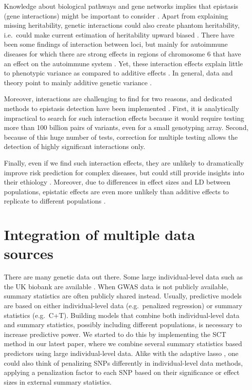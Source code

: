 Knowledge about biological pathways and gene networks implies that epistasis (gene interactions) might be important to consider \cite[]{hill2008data}. 
Apart from explaining missing heritability, genetic interactions could also create phantom heritability, i.e.\ could make current estimation of heritability upward biased \cite[]{zuk2012mystery}.
There have been some findings of interaction between loci, but mainly for autoimmune diseases for which there are strong effects in regions of chromosome 6 that have an effect on the autoimmune system \cite[]{lenz2015widespread,goudey2017interactions}.
Yet, these interaction effects explain little to phenotypic variance as compared to additive effects \cite[]{lenz2015widespread}.
In general, data and theory point to mainly additive genetic variance \cite[]{hill2008data}.

Moreover, interactions are challenging to find for two reasons, and dedicated methods to epistasis detection have been implemented \cite[]{niel2015survey}. First, it is analytically impractical to search for such interaction effects because it would require testing more than 100 billion pairs of variants, even for a small genotyping array. Second, because of this huge number of tests, correction for multiple testing allows the detection of highly significant interactions only.

Finally, even if we find such interaction effects, they are unlikely to dramatically improve risk prediction for complex diseases, but could still provide insights into their ethiology \cite[]{aschard2012inclusion}. 
Moreover, due to differences in effect sizes and LD between populations, epistatic effects are even more unlikely than additive effects to replicate to different populations  \cite[]{hill2008data,visscher201710}.

\section{Integration of multiple data sources}

There are many genetic data out there. Some large individual-level data such as the UK biobank are available \cite[]{bycroft2017genome}. When GWAS data is not publicly available, summary statistics are often publicly shared instead. 
Usually, predictive models are based on either individual-level data (e.g.\ penalized regression) or summary statistics (e.g.\ C+T).
Building models that combine both individual-level data and summary statistics, possibly including different populations, is necessary to increase predictive power.
We started to do this by implementing the SCT method in our latest paper, where we combine several summary statistics based predictors using large individual-level data.
Alike with the adaptive lasso \cite[]{zou2006adaptive}, one could also think of penalizing SNPs differently in individual-level data methods, applying a penalization factor to each SNP based on their significance or effect sizes in external summary statistics.

